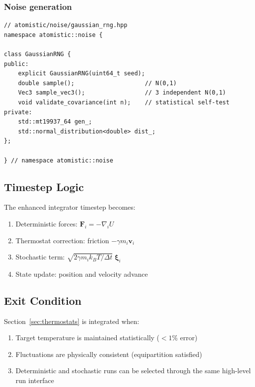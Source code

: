 \documentclass[11pt]{article}
\begin{document}
\subsubsection{Noise generation}

\begin{lstlisting}
// atomistic/noise/gaussian_rng.hpp
namespace atomistic::noise {

class GaussianRNG {
public:
    explicit GaussianRNG(uint64_t seed);
    double sample();                    // N(0,1)
    Vec3 sample_vec3();                 // 3 independent N(0,1)
    void validate_covariance(int n);    // statistical self-test
private:
    std::mt19937_64 gen_;
    std::normal_distribution<double> dist_;
};

} // namespace atomistic::noise
\end{lstlisting}

\subsection{Timestep Logic}

The enhanced integrator timestep becomes:
\begin{enumerate}
  \item Deterministic forces: $\mathbf{F}_i = -\nabla_i U$
  \item Thermostat correction: friction $-\gamma m_i \mathbf{v}_i$
  \item Stochastic term: $\sqrt{2\gamma m_i k_B T / \Delta t}\;\boldsymbol{\xi}_i$
  \item State update: position and velocity advance
\end{enumerate}

\subsection{Exit Condition}

Section~\ref{sec:thermostats} is integrated when:
\begin{enumerate}
  \item Target temperature is maintained statistically ($< 1\%$ error)
  \item Fluctuations are physically consistent (equipartition satisfied)
  \item Deterministic and stochastic runs can be selected through the
        same high-level run interface
\end{enumerate}

\end{document}
